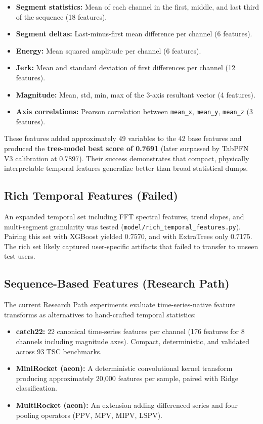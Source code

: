 \documentclass[12pt, a4paper]{article}
\begin{document}
\begin{itemize}
    \item \textbf{Segment statistics:} Mean of each channel in the first, middle, and last third of the sequence (18 features).
    \item \textbf{Segment deltas:} Last-minus-first mean difference per channel (6 features).
    \item \textbf{Energy:} Mean squared amplitude per channel (6 features).
    \item \textbf{Jerk:} Mean and standard deviation of first differences per channel (12 features).
    \item \textbf{Magnitude:} Mean, std, min, max of the 3-axis resultant vector (4 features).
    \item \textbf{Axis correlations:} Pearson correlation between \texttt{mean\_x}, \texttt{mean\_y}, \texttt{mean\_z} (3 features).
\end{itemize}

These features added approximately 49 variables to the 42 base features and produced the \textbf{tree-model best score of 0.7691} (later surpassed by TabPFN V3 calibration at 0.7897). Their success demonstrates that compact, physically interpretable temporal features generalize better than broad statistical dumps.

\subsection{Rich Temporal Features (Failed)}

An expanded temporal set including FFT spectral features, trend slopes, and multi-segment granularity was tested (\texttt{model/rich\_temporal\_features.py}). Pairing this set with XGBoost yielded 0.7570, and with ExtraTrees only 0.7175. The rich set likely captured user-specific artifacts that failed to transfer to unseen test users.

\subsection{Sequence-Based Features (Research Path)}

The current Research Path experiments evaluate time-series-native feature transforms as alternatives to hand-crafted temporal statistics:

\begin{itemize}
    \item \textbf{catch22:} 22 canonical time-series features per channel (176 features for 8 channels including magnitude axes). Compact, deterministic, and validated across 93 TSC benchmarks.
    \item \textbf{MiniRocket (aeon):} A deterministic convolutional kernel transform producing approximately 20{,}000 features per sample, paired with Ridge classification.
    \item \textbf{MultiRocket (aeon):} An extension adding differenced series and four pooling operators (PPV, MPV, MIPV, LSPV).
\end{itemize}
\end{document}
